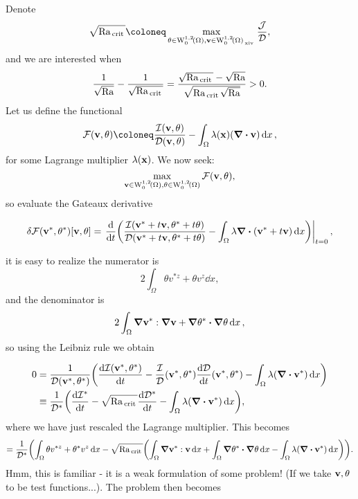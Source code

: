 \documentclass[reqno, a4paper]{article}
\begin{document}
Denote
\[
	\sqrt{\Rayleigh_{\, \text{crit} \,}} \coloneq \max_{\theta \in \WkpzeroSet[1][2]{\Omega}, \vb{v} \in \WkpzeroSet[1][2]{\Omega}_{\, \text{xiv} \,}} \frac{\mathcal{J}}{\mathcal{D}},
\]
and we are interested when
\[
	\frac{1}{\sqrt{\mathrm{Ra}}}- \frac{1}{\sqrt{\mathrm{Ra}_{\, \text{crit} \,}}} = \frac{\sqrt{\mathrm{Ra}_{\, \text{crit} \,}}- \sqrt{\mathrm{Ra}}}{\sqrt{\mathrm{Ra}_{\, \text{crit} \,} \sqrt{\mathrm{Ra}}}} >0.
\]
Let us define the functional
\[
	\mathcal{F}\qty(\vb{v}, \theta) \coloneq \frac{\mathcal{I}\qty(\vb{v}, \theta)}{\mathcal{D}\qty(\vb{v}, \theta)} - \int_{\Omega}\lambda\qty(\vb{x}) \qty(\divergence{\vb{v}})\dd{x},
\]
for some Lagrange multiplier $\lambda(\vb{x})$. We now seek:
\[
	\max_{\vb{v}\in \WkpzeroSet[1][2]{\Omega}, \theta \in \WkpzeroSet[1][2]{\Omega}}\mathcal{F}\qty(\vb{v}, \theta),
\]
so evaluate the Gateaux derivative


\[
	\delta \mathcal{F}(\vb{v}^{*}, \theta^{*})[\vb{v}, \theta] =\eval{\dv{t} (\frac{\mathcal{I}(\vb{v}^{*}+ t \vb{v}, \theta^{*} + t \theta)}{\mathcal{D}(\vb{v}^{*}+t \vb{v}, \theta^{*}+t \theta)} - \int_{\Omega}\lambda \divergence{(\vb{v}^{*}+t \vb{v})}\dd{x})}_{t=0},
\]

it is easy to realize the numerator is
\[
	2 \int_{\Omega}\theta v^{*z} + \theta v^z\dd{x},
\]
and the denominator is
\[
	2 \int_{\Omega}\grad \vb{v}^{*} : \grad \vb{v} + \grad \theta^{*} \vdot \grad \theta \dd{x},
\]
so using the Leibniz rule we obtain

\begin{align*}
	0 &= \frac{1}{\mathcal{D}\qty(\vb{v}^{*}, \theta^{*})}\qty(\dv{\mathcal{I}\qty(\vb{v}^{*}, \theta^{*})}{t} - \frac{\mathcal{I}}{\mathcal{D}}\qty(\vb{v}^{*}, \theta^{*})\dv{\mathcal{D}}{t}\qty(\vb{v}^{*}, \theta^{*})- \int_{\Omega}\lambda \qty(\divergence{\vb{v}^{*}})\dd{x}) \\
	  &\equiv \frac{1}{\mathcal{D}^{*}}\qty(\dv{\mathcal{I}^{*}}{t}-\sqrt{\Rayleigh_{\, \text{crit} \,}}\dv{\mathcal{D}^{*}}{t}-\int_{\Omega}\lambda \qty(\divergence{\vb{v}^{*}})\dd{x}),
\end{align*}
where we have just rescaled the Lagrange multiplier. This becomes
\[
	= \frac{1}{\mathcal{D}^{*}}\qty(\int_{\Omega} \theta v^{*z} + \theta^{*} v^z\dd{x} - \sqrt{\Rayleigh_{\, \text{crit} \,}} \qty(\int_{\Omega}\grad \vb{v}^{*} : \vb{v}\dd{x} + \int_{\Omega}\grad \theta^{*} \vdot \grad \theta\dd{x} - \int_{\Omega}\lambda \qty(\divergence{\vb{v}^{*}})\dd{x})).
\]
Hmm, this is familiar - it is a weak formulation of some problem! (If we take $\vb{v}, \theta$ to be test functions...). The problem then becomes
\end{document}
